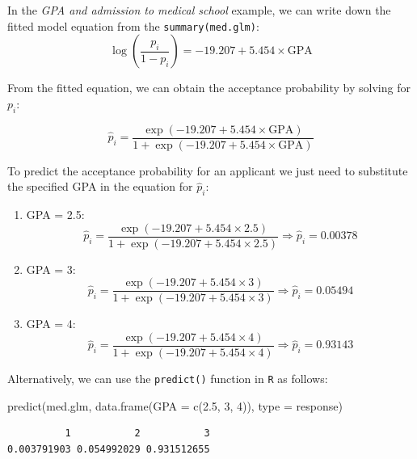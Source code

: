 \documentclass[
  a4paper,
  DIV=11,
  numbers=noendperiod]{scrreprt}
\newenvironment{Shaded}{\begin{snugshade}}{\end{snugshade}}
\newcommand{\AttributeTok}[1]{\textcolor[rgb]{0.40,0.45,0.13}{#1}}
\newcommand{\DecValTok}[1]{\textcolor[rgb]{0.68,0.00,0.00}{#1}}
\newcommand{\FloatTok}[1]{\textcolor[rgb]{0.68,0.00,0.00}{#1}}
\newcommand{\FunctionTok}[1]{\textcolor[rgb]{0.28,0.35,0.67}{#1}}
\newcommand{\NormalTok}[1]{\textcolor[rgb]{0.00,0.23,0.31}{#1}}
\newcommand{\StringTok}[1]{\textcolor[rgb]{0.13,0.47,0.30}{#1}}
\newenvironment{fbxSimple}[3]{\begin{tcolorbox}[enhanced, breakable,%
attach boxed title to top*={xshift=1.4pt},
boxed title style={boxrule=0.0mm, fuzzy shadow={1pt}{-1pt}{0mm}{0.1mm}{gray}, arc=.3em, rounded corners=east, sharp corners=west}, colframe=#1-color2, colbacktitle=#1-color1, colback = white, coltitle=black,  titlerule=0mm, toprule=0pt, bottomrule=.7pt, leftrule=.3em, rightrule=.7pt, outer arc=.3em,  	left=.5em, right=.5em, bottomtitle=1mm, toptitle=1mm,title=\textbf{#2}\hspace{0.5em}{#3}]}
{\end{tcolorbox}}
\begin{document}
\label{Answer-2}
\begin{fbxSimple}{Answer}{Answer 2}{}
\label{Answer-2}

In the \emph{GPA and admission to medical school} example, we can write
down the fitted model equation from the \texttt{summary(med.glm)}:
\[\log\left(\frac{p_i}{1-p_i}\right) =-19.207 + 5.454 \times \text{GPA}\]

From the fitted equation, we can obtain the acceptance probability by
solving for \(p_i\):

\[\hat{p}_i = \frac{\exp(-19.207 + 5.454 \times \text{GPA})} {1+ \exp(-19.207 + 5.454 \times \text{GPA})} \]

To predict the acceptance probability for an applicant we just need to
substitute the specified GPA in the equation for \(\hat{p}_i\):

\begin{enumerate}
\def\labelenumi{(\roman{enumi})}
\item
  GPA = 2.5:
  \[\hat{p}_i = \frac{\exp(-19.207 + 5.454 \times 2.5)} {1+ \exp(-19.207 + 5.454 \times 2.5)} \Rightarrow \hat{p}_i = 0.00378 \]
\item
  GPA = 3:
  \[\hat{p}_i = \frac{\exp(-19.207 + 5.454 \times 3)} {1+ \exp(-19.207 + 5.454 \times 3)} \Rightarrow \hat{p}_i = 0.05494\]
\item
  GPA = 4:
  \[\hat{p}_i = \frac{\exp(-19.207 + 5.454 \times 4)} {1+ \exp(-19.207 + 5.454 \times 4)} \Rightarrow \hat{p}_i = 0.93143\]
\end{enumerate}

Alternatively, we can use the \texttt{predict()} function in \texttt{R}
as follows:

\begin{Shaded}
\begin{Highlighting}[]
\FunctionTok{predict}\NormalTok{(med.glm, }\FunctionTok{data.frame}\NormalTok{(}\AttributeTok{GPA =} \FunctionTok{c}\NormalTok{(}\FloatTok{2.5}\NormalTok{, }\DecValTok{3}\NormalTok{, }\DecValTok{4}\NormalTok{)), }\AttributeTok{type =} \StringTok{\textquotesingle{}response\textquotesingle{}}\NormalTok{)}
\end{Highlighting}
\end{Shaded}

\begin{verbatim}
          1           2           3 
0.003791903 0.054992029 0.931512655 
\end{verbatim}

\end{fbxSimple}
\end{document}
